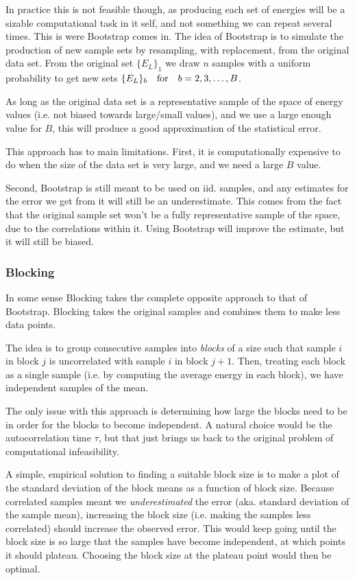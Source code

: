\documentclass[a4paper, 11pt]{article}
\begin{document}
\begin{multicols}{2}
In practice this is not feasible though, as producing each set of energies will be a
sizable computational task in it self, and not something we can repeat several
times. This is were Bootstrap comes in. The idea of Bootstrap is to simulate
the production of new sample sets by resampling, with replacement, from the
original data set. From the original set $\{E_L\}_1$ we draw $n$ samples with a
uniform probability to get new sets $\{E_L\}_b\qfor b = 2,3,\dots,B$.

As long as the original data set is a representative sample of the space of
energy values (i.e. not biased towards large/small values), and we use a large
enough value for $B$, this will produce a good approximation of the statistical
error. 

This approach has to main limitations. First, it is computationally
expensive to do when the size of the data set is very large, and we need a large
$B$ value.

Second, Bootstrap is still meant to be used on iid. samples, and any estimates
for the error we get from it will still be an underestimate. This comes from the
fact that the original sample set won't be a fully representative sample of the
space, due to the correlations within it. Using Bootstrap will improve the
estimate, but it will still be biased.


\subsubsection{Blocking}

In some sense Blocking takes the complete opposite approach to that of
Bootstrap. Blocking takes the original samples and combines them to make less
data points.

The idea is to group consecutive samples into \textit{blocks} of a size such
that sample $i$ in block $j$ is uncorrelated with sample $i$ in block $j+1$.
Then, treating each block as a single sample (i.e. by computing the average
energy in each block), we have independent samples of the mean. 

The only issue with this approach is determining how large the blocks need to be
in order for the blocks to become independent. A natural choice would be the
autocorrelation time $\tau$, but that just brings us back to the original
problem of computational infeasibility.

A simple, empirical solution to finding a suitable block size is to make a plot
of the standard deviation of the block means as a function of block
size. Because correlated samples meant we \textit{underestimated} the error (aka.
standard deviation of the sample mean), increasing the block size (i.e. making the
samples less correlated) should increase the observed error. This would keep
going until the block size is so large that the samples have become independent,
at which points it should plateau. Choosing the block size at the plateau point
would then be optimal.


\end{multicols}
\end{document}
